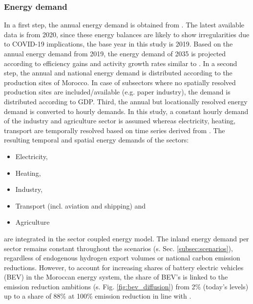 \subsubsection{Energy demand}
In a first step, the annual energy demand is obtained from \cite{unstats2023}. The latest available data is from 2020, since these energy balances are likely to show irregularities due to COVID-19 implications, the base year in this study is 2019. Based on the annual energy demand from 2019, the energy demand of 2035 is projected according to efficiency gains and activity growth rates similar to \cite{Muller2023}.
In a second step, the annual and national energy demand is distributed according to the production sites of Morocco. %
In case of subsectors where no spatially resolved production sites are included/available (e.g. paper industry), the demand is distributed according to GDP. %
Third, the annual but locationally resolved energy demand is converted to hourly demands. In this study, a constant hourly demand of the industry and agriculture sector is assumed whereas electricity, heating, transport are temporally resolved based on time series derived from \cite{Brown2018a}. The resulting temporal and spatial energy demands of the sectors:
\begin{itemize}
    \item Electricity,
    \item Heating,
    \item Industry,
    \item Transport (incl. aviation and shipping) and
    \item Agriculture
\end{itemize}
are integrated in the sector coupled energy model. The inland energy demand per sector remains constant throughout the scenarios (s. Sec. \ref{subsec:scenarios}), regardless of endogenous hydrogen export volumes or national carbon emission reductions. However, to account for increasing shares of battery electric vehicles (BEV) in the Moroccan energy system, the share of BEV's is linked to the emission reduction ambitions (s. Fig. \ref{fig:bev_diffusion}) from 2\% (today's levels) up to a share of 88\% at 100\% emission reduction in line with \cite{Rim2021}.




